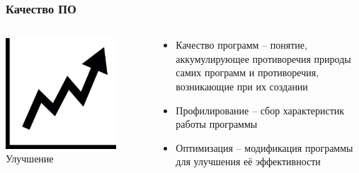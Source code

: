 \documentclass[10pt]{beamer}
\begin{document}
\begin{frame}
\frametitle{Качество ПО}

\begin{columns}[c]

\begin{center}
  \includegraphics[width=0.8\textwidth]{res/img/improve.png}
  Улучшение
\end{center}

\begin{block}{}
\begin{itemize}
  \item Качество программ -- понятие, аккумулирующее противоречия природы самих программ и противоречия, возникающие при их создании
  \item Профилирование -- сбор характеристик работы программы
  \item Оптимизация -- модификация программы для улучшения её эффективности
\end{itemize}
\end{block}

\end{columns}


\end{frame}
\end{document}
